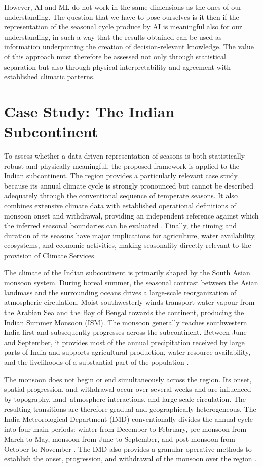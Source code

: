 However, AI and ML do not work in the same dimensions as the ones of our understanding. The question that we have to pose ourselves is it then if the representation of the seasonal cycle produce by AI is meaningful also for our understanding, in such a way that the results obtained can be used as information underpinning the creation of decision-relevant knowledge. The value of this approach must therefore be assessed not only through statistical separation but also through physical interpretability and agreement with established climatic patterns.


\section{Case Study: The Indian Subcontinent}

To assess whether a data driven representation of seasons is both statistically robust and physically meaningful, the proposed framework is applied to the Indian subcontinent. The region provides a particularly relevant case study because its annual climate cycle is strongly pronounced but cannot be described adequately through the conventional sequence of temperate seasons. It also combines extensive climate data with established operational definitions of monsoon onset and withdrawal, providing an independent reference against which the inferred seasonal boundaries can be evaluated \citep{pai_normal_2020}. Finally, the timing and duration of its seasons have major implications for agriculture, water availability, ecosystems, and economic activities, making seasonality directly relevant to the provision of Climate Services.

The climate of the Indian subcontinent is primarily shaped by the South Asian monsoon system. During boreal summer, the seasonal contrast between the Asian landmass and the surrounding oceans drives a large-scale reorganization of atmospheric circulation. Moist southwesterly winds transport water vapour from the Arabian Sea and the Bay of Bengal towards the continent, producing the Indian Summer Monsoon (ISM). The monsoon generally reaches southwestern India first and subsequently progresses across the subcontinent. Between June and September, it provides most of the annual precipitation received by large parts of India and supports agricultural production, water-resource availability, and the livelihoods of a substantial part of the population \citep{gadgil_indian_2003,amrith_risk_2018}.

The monsoon does not begin or end simultaneously across the region. Its onset, spatial progression, and withdrawal occur over several weeks and are influenced by topography, land--atmosphere interactions, and large-scale circulation. The resulting transitions are therefore gradual and geographically heterogeneous. The India Meteorological Department (IMD) conventionally divides the annual cycle into four main periods: winter from December to February, pre-monsoon from March to May, monsoon from June to September, and post-monsoon from October to November \citep{praveen_analyzing_2020}. The IMD also provides a granular operative methods to establish the onset, progression, and withdrawal of the monsoon over the region \citep{pai_normal_2020}. 

